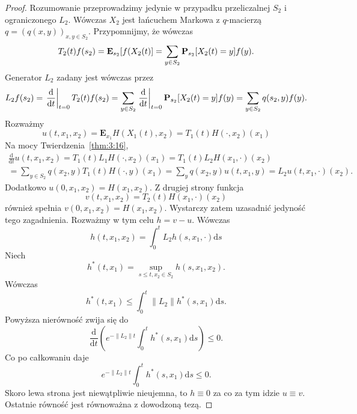 \documentclass{article}
\begin{document}
	\begin{proof}
		Rozumowanie przeprowadzimy jedynie w przypadku przeliczalnej $S_2$ i ograniczonego 
		$L_2$. Wówczas $X_2$ jest łańcuchem Markowa z $q$-macierzą $q=(q(x,y))_{x,y\in S_2}$.
		Przypomnijmy, że wówczas
		\begin{equation*}
			T_2(t)f(s_2)=\mathbf{E}_{s_2}[f(X_2(t)] = \sum_{y \in S_2} \mathbf{P}_{s_2}[X_2(t) =y] f(y).
		\end{equation*}
		Generator $L_2$ zadany jest wówczas przez
		\begin{equation*}
			L_2 f(s_2) = \left.\frac{\mathrm{d}}{\mathrm{d}t} \right|_{t=0} T_2(t)f(s_2)
			= \sum_{y \in S_2}\left.\frac{\mathrm{d}}{\mathrm{d}t} \right|_{t=0} 
				\mathbf{P}_{s_2}[X_2(t) =y] f(y)
			=\sum_{y \in S_2} q(s_2, y)f(y).
		\end{equation*}
		Rozważmy
		\begin{equation}\label{eq:3-31}
			u(t, x_1, x_2) = \mathbf{E}_{x_1}H(X_1(t), x_2) = T_1(t) H(\cdot, x_2)(x_1)
		\end{equation}
		Na mocy Twierdzenia~\ref{thm:3:16},
		\begin{multline}
			\frac{\mathrm{d}}{\mathrm{d}t} u(t, x_1, x_2) 
			= T_1(t)L_1 H(\cdot, x_2)(x_1) = T_1(t)L_2 H(x_1, \cdot)(x_2) \\
			= \sum_{y\in S_2} q(x_2, y) T_1(t) H(\cdot, y)(x_1) 
			= \sum_y q(x_2, y) u(t, x_1, y)
			= L_2 u(t, x_1, \cdot)(x_2).
		\end{multline}
		Dodatkowo $u(0, x_1, x_2) = H(x_1, x_2)$.
		Z drugiej strony funkcja 
		\begin{equation*}
			v(t,x_1, x_2) = T_2(t)H(x_1, \cdot)(x_2)
		\end{equation*}
		również spełnia $v(0,x_1, x_2) = H(x_1, x_2)$. Wystarczy zatem uzasadnić 
		jedyność tego zagadnienia. Rozważmy w tym celu $h = v-u$. Wówczas
		\begin{equation*}
			h(t,x_1, x_2) = \int_0^t L_2 h(s, x_1, \cdot ) \mathrm{d}s
		\end{equation*}
		Niech 
		\begin{equation*}
			h^*(t,x_1) = \sup_{ s \leq t, x_2 \in S_2} h(s,x_1, x_2).
		\end{equation*}
		Wówczas
		\begin{equation*}
			h^*(t,x_1) \leq \int_0^t \|L_2\| h^*(s, x_1) \mathrm{d}s.
		\end{equation*}
		Powyższa nierówność zwija się do
		\begin{equation*}
			\frac{\mathrm{d}}{\mathrm{d}t} 
			\left(e^{- \|L_2\|t} \int_0^t h^*(s, x_1) \mathrm{d}s \right)\leq 0.
		\end{equation*}
		Co po całkowaniu daje
		\begin{equation*}
			e^{- \|L_2\|t} \int_0^t h^*(s, x_1) \mathrm{d}s\leq 0.
		\end{equation*}
		Skoro lewa strona jest niewątpliwie nieujemna, to $h \equiv 0$ za co za tym idzie 
		$u\equiv v$. Ostatnie równość jest równoważna z dowodzoną tezą.
\end{proof}
\end{document}
